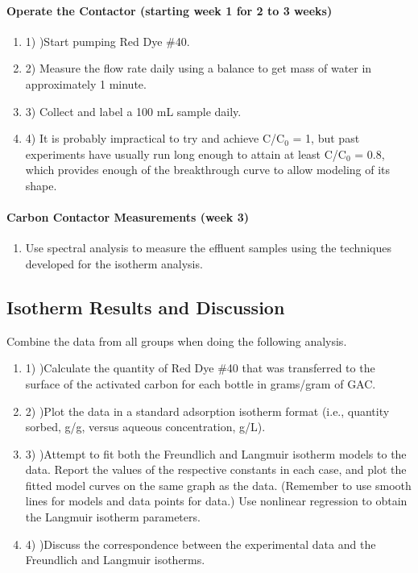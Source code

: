 \documentclass{article} %
\begin{document}
\noindent 
\paragraph{Operate the Contactor (starting week 1 for 2 to 3 weeks)}

\noindent \begin{enumerate}
\item 1) )Start pumping Red Dye \#40.

\noindent \item 2) Measure the flow rate daily using a balance to get mass of water in approximately 1 minute.

\noindent \item 3) Collect and label a 100 mL sample daily.

\noindent \item 4) It is probably impractical to try and achieve C/C${}_{0}$ = 1, but past experiments have usually run long enough to attain at least C/C${}_{0}$ = 0.8, which provides enough of the breakthrough curve to allow modeling of its shape. 
\end{enumerate}

\noindent 
\paragraph{Carbon Contactor Measurements (week 3)}

\begin{enumerate}
\item \textbf{ }Use spectral analysis to measure the effluent samples using the techniques developed for the isotherm analysis.
\end{enumerate}

\noindent 
\subsection{Isotherm Results and Discussion}

Combine the data from all groups when doing the following analysis.

\noindent \begin{enumerate}
\item 1) )Calculate the quantity of Red Dye \#40 that was transferred to the surface of the activated carbon for each bottle in grams/gram of GAC.

\noindent \item 2) )Plot the data in a standard adsorption isotherm format (i.e., quantity sorbed, g/g, versus aqueous concentration, g/L).

\noindent \item 3) )Attempt to fit both the Freundlich and Langmuir isotherm models to the data. Report the values of the respective constants in each case, and plot the fitted model curves on the same graph as the data. (Remember to use smooth lines for models and data points for data.) Use nonlinear regression to obtain the Langmuir isotherm parameters.

\noindent \item 4) )Discuss the correspondence between the experimental data and the Freundlich and Langmuir isotherms.
\end{enumerate}
\end{document}
